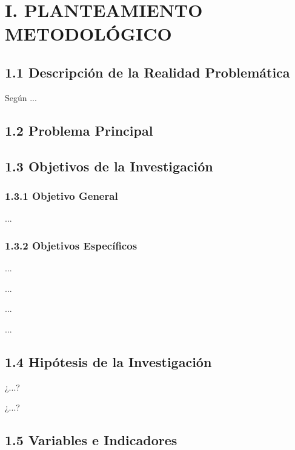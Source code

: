 \documentclass[stu, 12pt, letterpaper, donotrepeattitle, floatsintext, natbib]{apa7}
\begin{document}
 


\tableofcontents
\newpage


\section{I. PLANTEAMIENTO METODOLÓGICO} \label{cap:CAPI}

\subsection{1.1 Descripción de la Realidad Problemática}
Según ...
\subsection{1.2 Problema Principal}


\subsection{1.3 Objetivos de la Investigación}

\subsubsection{1.3.1 Objetivo General}
...

\subsubsection{1.3.2 Objetivos Específicos}
\begin{APAenumerate}
    \item ...
    \item ...
    \item ...
    \item ...
\end{APAenumerate}
  
\subsection{1.4 Hipótesis de la Investigación}
\begin{APAenumerate}
    \item ¿...?
    \item ¿...?
\end{APAenumerate}

\subsection{1.5 Variables e Indicadores}
\end{document}
